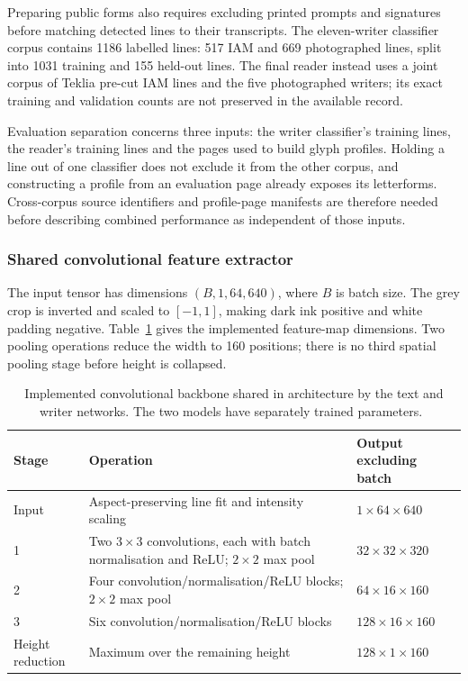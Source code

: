 Preparing public forms also requires excluding printed prompts and signatures before matching detected lines to their transcripts. The eleven-writer classifier corpus contains 1186 labelled lines: 517 IAM and 669 photographed lines, split into 1031 training and 155 held-out lines. The final reader instead uses a joint corpus of Teklia pre-cut IAM lines and the five photographed writers; its exact training and validation counts are not preserved in the available record.~\cite[project records; implementation]{brauneevidence2026,braunepipeline2026}

Evaluation separation concerns three inputs: the writer classifier's training lines, the reader's training lines and the pages used to build glyph profiles. Holding a line out of one classifier does not exclude it from the other corpus, and constructing a profile from an evaluation page already exposes its letterforms. Cross-corpus source identifiers and profile-page manifests are therefore needed before describing combined performance as independent of those inputs.~\cite[recognise.py; train.py; trainlibrary.py]{braunepipeline2026}

\subsubsection{Shared convolutional feature extractor}
The input tensor has dimensions $(B,1,64,640)$, where $B$ is batch size. The grey crop is inverted and scaled to $[-1,1]$, making dark ink positive and white padding negative. Table~\ref{tab:des-backbone} gives the implemented feature-map dimensions. Two pooling operations reduce the width to 160 positions; there is no third spatial pooling stage before height is collapsed.

\begin{table}[!htbp]\centering\small
\begin{tabularx}{\linewidth}{|l|X|l|}
\hline\textbf{Stage}&\textbf{Operation}&\textbf{Output excluding batch}\\\hline
Input&Aspect-preserving line fit and intensity scaling&$1\times64\times640$\\\hline
1&Two $3\times3$ convolutions, each with batch normalisation and ReLU; $2\times2$ max pool&$32\times32\times320$\\\hline
2&Four convolution/normalisation/ReLU blocks; $2\times2$ max pool&$64\times16\times160$\\\hline
3&Six convolution/normalisation/ReLU blocks&$128\times16\times160$\\\hline
Height reduction&Maximum over the remaining height&$128\times1\times160$\\\hline
\end{tabularx}
\caption{Implemented convolutional backbone shared in architecture by the text and writer networks. The two models have separately trained parameters.~\cite{brauneevidence2026,braunepipeline2026}}
\label{tab:des-backbone}
\end{table}

